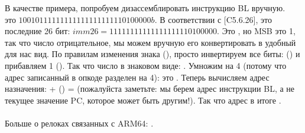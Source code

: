В качестве примера, попробуем дизассемблировать инструкцию BL вручную.\\
 это $10010111111111111111111110100000b$.
В соответствии с [\ARMSixFourRef C5.6.26],  это последние 26 бит: $imm26 = 11111111111111111110100000$.
Это , но \ac{MSB} это 1, 
так что число отрицательное, мы можем вручную его конвертировать в удобный для нас вид.
По правилам изменения знака (), просто инвертируем все биты: () и прибавляем 1 ().
Так что число в знаковом виде: .
Умножим  на 4 (потому что адрес записанный в опкоде разделен на 4): это .
Теперь вычисляем адрес назначения:  + () =  
(пожалуйста заметьте: мы берем адрес инструкции BL, а не текущее значение \ac{PC}, которое может быть другим!).
Так что адрес в итоге .\\
\\
Больше о релоках связанных с ARM64: \ARMELF.
